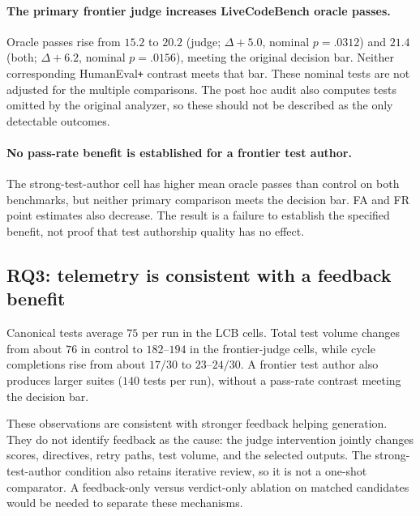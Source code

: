 \paragraph{The primary frontier judge increases LiveCodeBench oracle passes.} Oracle
passes rise from $15.2$ to $20.2$ (judge; $\Delta{+}5.0$, nominal $p{=}.0312$) and $21.4$
(both; $\Delta{+}6.2$, nominal $p{=}.0156$), meeting the original decision bar. Neither
corresponding HumanEval\texttt{+} contrast meets that bar. These nominal tests are not
adjusted for the multiple comparisons. The post hoc audit also computes tests omitted by
the original analyzer, so these should not be described as the only detectable outcomes.

\paragraph{No pass-rate benefit is established for a frontier test author.} The
strong-test-author cell has higher mean oracle passes than control on both benchmarks, but
neither primary comparison meets the decision bar. FA and FR point estimates also decrease.
The result is a failure to establish the specified benefit, not proof that test authorship
quality has no effect.

\subsection{RQ3: telemetry is consistent with a feedback benefit}
\label{sec:results-mech}

Canonical tests average $75$ per run in the LCB cells. Total test volume changes from about
$76$ in control to $182$--$194$ in the frontier-judge cells, while cycle completions rise from
about $17/30$ to $23$--$24/30$. A frontier test author also produces larger suites ($140$
tests per run), without a pass-rate contrast meeting the decision bar.

These observations are consistent with stronger feedback helping generation. They do not
identify feedback as the cause: the judge intervention jointly changes scores, directives,
retry paths, test volume, and the selected outputs. The strong-test-author condition also
retains iterative review, so it is not a one-shot comparator. A feedback-only versus
verdict-only ablation on matched candidates would be needed to separate these mechanisms.

